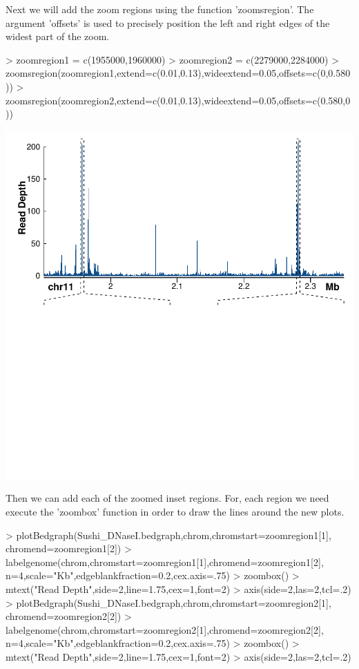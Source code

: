 \documentclass{article}
\begin{document}
Next we will add the zoom regions using the function 'zoomsregion'.  The argument 'offsets' is used to precisely position the left and right edges of the widest part of the zoom.

\begin{Schunk}
\begin{Sinput}
> zoomregion1      = c(1955000,1960000)
> zoomregion2      = c(2279000,2284000)
> zoomsregion(zoomregion1,extend=c(0.01,0.13),wideextend=0.05,offsets=c(0,0.580))
> zoomsregion(zoomregion2,extend=c(0.01,0.13),wideextend=0.05,offsets=c(0.580,0))
\end{Sinput}
\end{Schunk}

\begin{center}
\includegraphics{Sushi-036}
\end{center}

Then we can add each of the zoomed inset regions.  For, each region we need execute the 'zoombox' function in order to draw the lines around the new plots.

\begin{Schunk}
\begin{Sinput}
> plotBedgraph(Sushi_DNaseI.bedgraph,chrom,chromstart=zoomregion1[1],
              chromend=zoomregion1[2])
> labelgenome(chrom,chromstart=zoomregion1[1],chromend=zoomregion1[2],
             n=4,scale="Kb",edgeblankfraction=0.2,cex.axis=.75)
> zoombox()
> mtext("Read Depth",side=2,line=1.75,cex=1,font=2)
> axis(side=2,las=2,tcl=.2)
> plotBedgraph(Sushi_DNaseI.bedgraph,chrom,chromstart=zoomregion2[1],
              chromend=zoomregion2[2])
> labelgenome(chrom,chromstart=zoomregion2[1],chromend=zoomregion2[2],
             n=4,scale="Kb",edgeblankfraction=0.2,cex.axis=.75)
> zoombox()
> mtext("Read Depth",side=2,line=1.75,cex=1,font=2)
> axis(side=2,las=2,tcl=.2)
\end{Sinput}
\end{Schunk}
\end{document}
